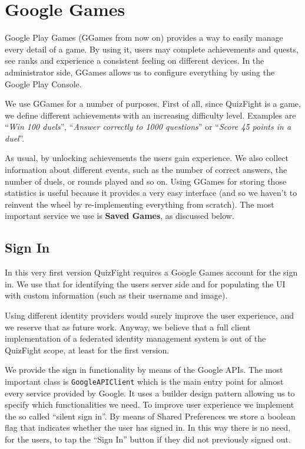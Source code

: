\section{Google Games}\label{sec:ggames}

Google Play Games (GGames from now on) provides a way to easily manage every
detail of a game. By using it, users may complete achievements and quests,
see ranks and experience a consistent feeling on different devices.
In the administrator side, GGames allows us to configure everything by using
the Google Play Console.

We use GGames for a number of purposes. First of all, since QuizFight is a
game, we define different achievements with an increasing difficulty level.
Examples are ``\textit{Win 100 duels}'', ``\textit{Answer correctly to 1000
questions}'' or ``\textit{Score 45 points in a duel}''.

As usual, by unlocking achievements the users gain experience.
We also collect information about different events, such as the number of
correct answers, the number of duels, or rounds played and so on.
Using GGames for storing those statistics is useful because it provides a
very easy interface (and so we haven't to reinvent the wheel by re-implementing
everything from scratch).
The most important service we use is \textbf{Saved Games}, as discussed below.

\subsection{Sign In}

In this very first version QuizFight requires a Google Games account for the
sign in. We use that for identifying the users server side and for populating
the UI with custom information (such as their username and image).

Using different identity providers would surely improve the user experience,
and we reserve that as future work.
Anyway, we believe that a full client implementation of a federated identity
management system is out of the QuizFight scope, at least for the first
version.

We provide the sign in functionality by means of the Google APIs.
The most important class is \texttt{GoogleAPIClient} which is the main entry
point for almost every service provided by Google.
It uses a builder design pattern allowing us to specify which functionalities
we need.
To improve user experience we implement the so called ``silent sign in''.
By means of Shared Preferences we store a boolean flag that indicates whether
the user has signed in.
In this way there is no need, for the users, to tap the ``Sign In'' button if
they did not previously signed out. 

